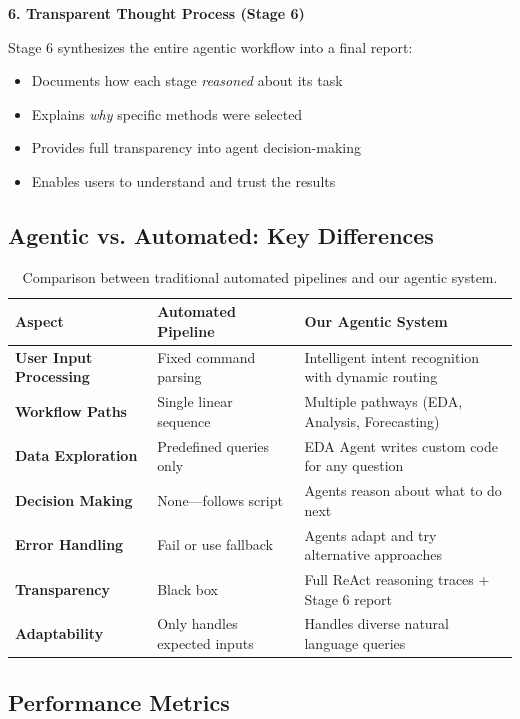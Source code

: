 \documentclass[11pt,a4paper]{article}
\begin{document}
\textbf{6. Transparent Thought Process (Stage 6)}

Stage 6 synthesizes the entire agentic workflow into a final report:
\begin{itemize}
    \item Documents how each stage \textit{reasoned} about its task
    \item Explains \textit{why} specific methods were selected
    \item Provides full transparency into agent decision-making
    \item Enables users to understand and trust the results
\end{itemize}

\subsection{Agentic vs. Automated: Key Differences}

\begin{table}[H]
\centering
\small
\begin{tabular}{p{3.5cm}p{5.5cm}p{5.5cm}}
\toprule
\textbf{Aspect} & \textbf{Automated Pipeline} & \textbf{Our Agentic System} \\
\midrule
\textbf{User Input Processing} & Fixed command parsing & Intelligent intent recognition with dynamic routing \\
\midrule
\textbf{Workflow Paths} & Single linear sequence & Multiple pathways (EDA, Analysis, Forecasting) \\
\midrule
\textbf{Data Exploration} & Predefined queries only & EDA Agent writes custom code for any question \\
\midrule
\textbf{Decision Making} & None---follows script & Agents reason about what to do next \\
\midrule
\textbf{Error Handling} & Fail or use fallback & Agents adapt and try alternative approaches \\
\midrule
\textbf{Transparency} & Black box & Full ReAct reasoning traces + Stage 6 report \\
\midrule
\textbf{Adaptability} & Only handles expected inputs & Handles diverse natural language queries \\
\bottomrule
\end{tabular}
\caption{Comparison between traditional automated pipelines and our agentic system.}
\end{table}

\subsection{Performance Metrics}
\end{document}
